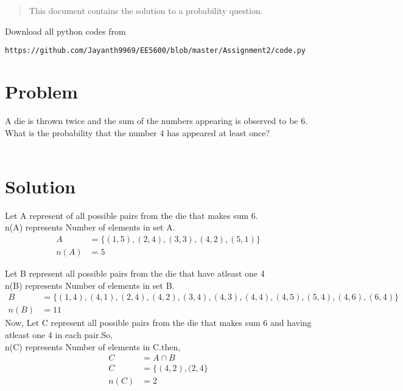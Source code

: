 \begin{enumerate}[label=\thesection.\arabic*.,ref=\thesection.\theenumi]

\begin{abstract}
This document contains the solution to a probability question.\\
\end{abstract}
Download all python codes from 
%
\begin{lstlisting}
https://github.com/Jayanth9969/EE5600/blob/master/Assignment2/code.py
\end{lstlisting}

\section{Problem}

A die is thrown twice and the sum of the 
numbers appearing is observed to be 6. What
is the probability that the number 4 has appeared 
at least once? \\ \\ 

\section{Solution}

\begin{enumerate}
    Let A represent of all possible pairs from the die that makes sum 6.\\ 
    n(A) represents Number of elements in set A.
    \begin{align}
        A &= \{(1,5),(2,4),(3,3),(4,2),(5,1)\} \\ 
        n(A) &= 5 
    \end{align}

    Let B represent all possible pairs from the die that have atleast one 4\\ 
    n(B) represents Number of elements in set B.
    \begin{align}
        B &= \{(1,4),(4,1),(2,4),(4,2),(3,4),(4,3),(4,4),(4,5),(5,4),(4,6),(6,4)\}\\
        n(B) &= 11
    \end{align}
    Now,
    Let C represent all possible pairs from the die that makes sum 6 and having atleast one 4 in each pair.So,\\ 
    n(C) represents Number of elements in C.then,
    \begin{align}
        C &= A \cap B \\ 
        C &= \{(4,2),(2,4\}\\ 
        n(C) &= 2 
    \end{align}
    

\end{enumerate}
\end{enumerate}
